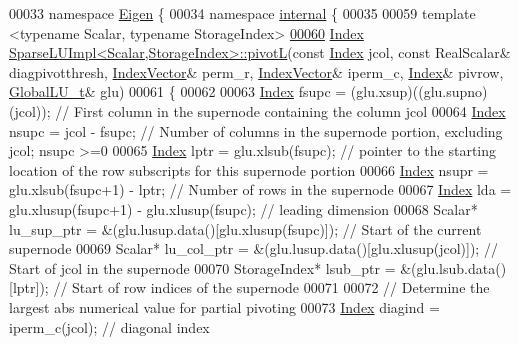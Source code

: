 \begin{DoxyCode}
00033 \textcolor{keyword}{namespace }\hyperlink{namespace_eigen}{Eigen} \{
00034 \textcolor{keyword}{namespace }\hyperlink{namespaceinternal}{internal} \{
00035   
00059 \textcolor{keyword}{template} <\textcolor{keyword}{typename} Scalar, \textcolor{keyword}{typename} StorageIndex>
\hyperlink{group___sparse_l_u___module_ab5f56947465b829f8d523575724c3ac6}{00060} \hyperlink{namespace_eigen_a62e77e0933482dafde8fe197d9a2cfde}{Index} \hyperlink{group___sparse_l_u___module_ab5f56947465b829f8d523575724c3ac6}{SparseLUImpl<Scalar,StorageIndex>::pivotL}(\textcolor{keyword}{const} 
      \hyperlink{namespace_eigen_a62e77e0933482dafde8fe197d9a2cfde}{Index} jcol, \textcolor{keyword}{const} RealScalar& diagpivotthresh, \hyperlink{group___core___module_class_eigen_1_1_matrix}{IndexVector}& perm\_r, 
      \hyperlink{group___core___module_class_eigen_1_1_matrix}{IndexVector}& iperm\_c, \hyperlink{namespace_eigen_a62e77e0933482dafde8fe197d9a2cfde}{Index}& pivrow, \hyperlink{struct_eigen_1_1internal_1_1_l_u___global_l_u__t}{GlobalLU\_t}& glu)
00061 \{
00062   
00063   \hyperlink{namespace_eigen_a62e77e0933482dafde8fe197d9a2cfde}{Index} fsupc = (glu.xsup)((glu.supno)(jcol)); \textcolor{comment}{// First column in the supernode containing the column
       jcol}
00064   \hyperlink{namespace_eigen_a62e77e0933482dafde8fe197d9a2cfde}{Index} nsupc = jcol - fsupc; \textcolor{comment}{// Number of columns in the supernode portion, excluding jcol; nsupc >=0}
00065   \hyperlink{namespace_eigen_a62e77e0933482dafde8fe197d9a2cfde}{Index} lptr = glu.xlsub(fsupc); \textcolor{comment}{// pointer to the starting location of the row subscripts for this
       supernode portion}
00066   \hyperlink{namespace_eigen_a62e77e0933482dafde8fe197d9a2cfde}{Index} nsupr = glu.xlsub(fsupc+1) - lptr; \textcolor{comment}{// Number of rows in the supernode}
00067   \hyperlink{namespace_eigen_a62e77e0933482dafde8fe197d9a2cfde}{Index} lda = glu.xlusup(fsupc+1) - glu.xlusup(fsupc); \textcolor{comment}{// leading dimension}
00068   Scalar* lu\_sup\_ptr = &(glu.lusup.data()[glu.xlusup(fsupc)]); \textcolor{comment}{// Start of the current supernode}
00069   Scalar* lu\_col\_ptr = &(glu.lusup.data()[glu.xlusup(jcol)]); \textcolor{comment}{// Start of jcol in the supernode}
00070   StorageIndex* lsub\_ptr = &(glu.lsub.data()[lptr]); \textcolor{comment}{// Start of row indices of the supernode}
00071   
00072   \textcolor{comment}{// Determine the largest abs numerical value for partial pivoting }
00073   \hyperlink{namespace_eigen_a62e77e0933482dafde8fe197d9a2cfde}{Index} diagind = iperm\_c(jcol); \textcolor{comment}{// diagonal index }

\end{DoxyCode}
